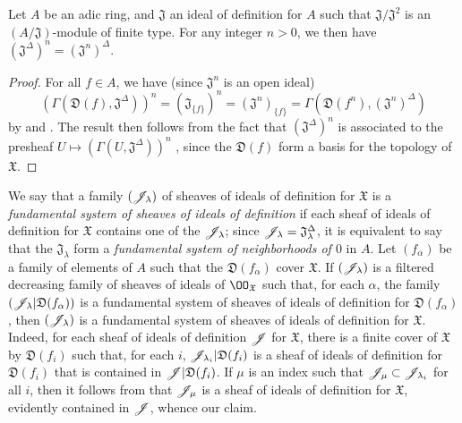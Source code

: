 \begin{prop}[10.3.6]
\label{1.10.3.6}
Let $A$ be an adic ring, and $\mathfrak{J}$ an ideal of definition for $A$ such that $\mathfrak{J}/\mathfrak{J}^2$ is an $(A/\mathfrak{J})$-module of finite type. For any integer $n>0$, we then have $(\mathfrak{J}^\Delta)^n=(\mathfrak{J}^n)^\Delta$.
\end{prop}

\begin{proof}
\label{proof-1.10.3.6}
For all $f\in A$, we have (since $\mathfrak{J}^n$ is an open ideal)
\[
  (\Gamma(\mathfrak{D}(f),\mathfrak{J}^\Delta))^n=(\mathfrak{J}_{\{f\}})^n=(\mathfrak{J}^n)_{\{f\}}=\Gamma(\mathfrak{D}(f^n),(\mathfrak{J}^n)^\Delta)
\]
by  and .
The result then follows from the fact that $(\mathfrak{J}^\Delta)^n$ is associated to the presheaf $U\mapsto(\Gamma(U,\mathfrak{J}^\Delta))^n$ , since the $\mathfrak{D}(f)$ form a basis for the topology of $\mathfrak{X}$.
\end{proof}

\begin{env}[10.3.7]
\label{1.10.3.7}
We say that a family $(\mathscr{J}_\lambda)$ of sheaves of ideals of definition for $\mathfrak{X}$ is a \emph{fundamental system of sheaves of ideals of definition} if each sheaf of ideals of definition for $\mathfrak{X}$ contains one of the $\mathscr{J}_\lambda$; since $\mathscr{J}_\lambda=\mathfrak{J}_\lambda^\Delta$, it is equivalent to say that the $\mathfrak{J}_\lambda$ form a \emph{fundamental system of neighborhoods of $0$} in $A$.
Let $(f_\alpha)$ be a family of elements of $A$ such that the $\mathfrak{D}(f_\alpha)$ cover $\mathfrak{X}$.
If $(\mathscr{J}_\lambda)$ is a filtered decreasing family of sheaves of ideals of $\OO_\mathfrak{X}$ such that, for each $\alpha$, the family $(\mathscr{J}_\lambda|\mathfrak{D}(f_\alpha))$ is a fundamental system of sheaves of ideals of definition for $\mathfrak{D}(f_\alpha)$, then $(\mathscr{J}_\lambda)$ is a fundamental system of sheaves of ideals of definition for $\mathfrak{X}$.
Indeed, for each sheaf of ideals of definition $\mathscr{J}$ for $\mathfrak{X}$, there is a finite cover of $\mathfrak{X}$ by $\mathfrak{D}(f_i)$ such that, for each $i$, $\mathscr{J}_{\lambda_i}|\mathfrak{D}(f_i)$ is a sheaf of ideals of definition for $\mathfrak{D}(f_i)$ that is contained in $\mathscr{J}|\mathfrak{D}(f_i)$.
If $\mu$ is an index such that $\mathscr{J}_\mu\subset\mathscr{J}_{\lambda_i}$ for all $i$, then it follows from  that $\mathscr{J}_\mu$ is a sheaf of ideals of definition for $\mathfrak{X}$, evidently contained in $\mathscr{J}$, whence our claim.
\end{env}

